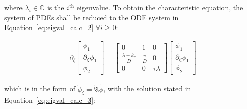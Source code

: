 
where $\lambda_i \in \mathbb{C}$ is the $i^{\text{th}}$ eigenvalue. To obtain the characteristic equation, the system of PDEs shall be reduced to the ODE system in Equation~\ref{eq:eigval_calc_2} $\forall i \geq 0$:

\begin{equation} \label{eq:eigval_calc_2}
    \begin{aligned}
        \partial_\zeta \begin{bmatrix}
            \phi_1 \\ \partial_\zeta \phi_1 \\ \phi_2
        \end{bmatrix} = \begin{bmatrix}
            0 & 1 & 0 \\
            \frac{\lambda-k_r}{D} & \frac{v}{D} & 0 \\
            0 & 0 & \tau \lambda 
        \end{bmatrix} \begin{bmatrix}
            \phi_1 \\ \partial_\zeta \phi_1 \\ \phi_2
        \end{bmatrix}
    \end{aligned}
\end{equation}

which is in the form of $ \tilde{\phi}_\zeta  = \tilde{\mathfrak{A}} \tilde{\phi}$, with the solution stated in Equation~\ref{eq:eigval_calc_3}:

